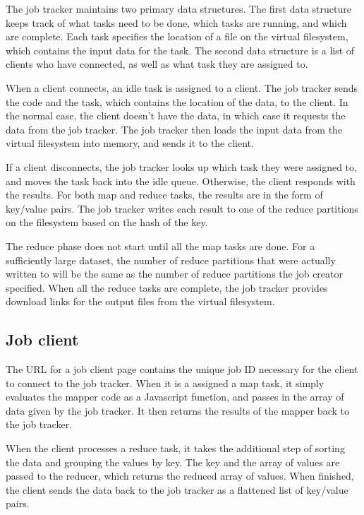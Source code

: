 \documentclass{article} %
\begin{document}
The job tracker maintains two primary data structures. The first data structure
keeps track of what tasks need to be done, which tasks are running, and which
are complete. Each task specifies the location of a file on the virtual
filesystem, which contains the input data for the task. The second data
structure is a list of clients who have connected, as well as what task they
are assigned to.

When a client connects, an idle task is assigned to a client. The job tracker
sends the code and the task, which contains the location of the data, to the
client. In the normal case, the client doesn't have the data, in which case it
requests the data from the job tracker. The job tracker then loads the input
data from the virtual filesystem into memory, and sends it to the client.

If a client disconnects, the job tracker looks up which task they were assigned
to, and moves the task back into the idle queue. Otherwise, the client responds
with the results. For both map and reduce tasks, the results are in the form of
key/value pairs. The job tracker writes each result to one of the reduce
partitions on the filesystem based on the hash of the key.

The reduce phase does not start until all the map tasks are done. For a
sufficiently large dataset, the number of reduce partitions that were actually
written to will be the same as the number of reduce partitions the job creator
specified. When all the reduce tasks are complete, the job tracker provides
download links for the output files from the virtual filesystem.

\subsection{Job client}
The URL for a job client page contains the unique job ID necessary for the
client to connect to the job tracker. When it is a assigned a map task, it
simply evaluates the mapper code as a Javascript function, and passes in the
array of data given by the job tracker. It then returns the results of the
mapper back to the job tracker.

When the client processes a reduce task, it takes the additional step of sorting
the data and grouping the values by key. The key and the array of values are
passed to the reducer, which returns the reduced array of values. When finished,
the client sends the data back to the job tracker as a flattened list of
key/value pairs.
\end{document}
